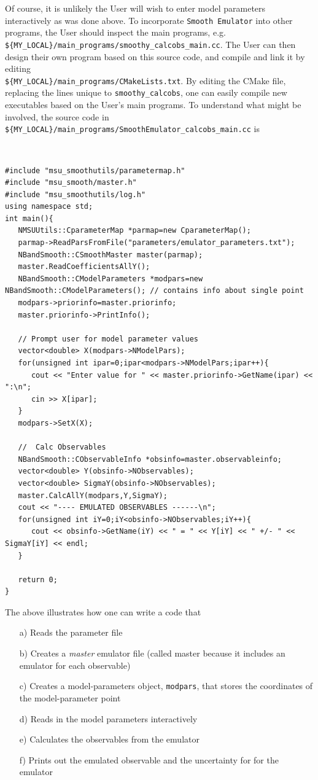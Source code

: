 \documentclass[UserManual.tex]{subfiles}
\begin{document}
Of course, it is unlikely the User will wish to enter model parameters interactively as was done above. To incorporate {\tt Smooth Emulator} into other programs, the User should inspect the main programs, e.g. {\tt \$\{MY\_LOCAL\}/main\_programs/smoothy\_calcobs\_main.cc}. The User can then design their own program based on this source code, and compile and link it by editing\\ {\tt \$\{MY\_LOCAL\}/main\_programs/CMakeLists.txt}. By editing the CMake file, replacing the lines unique to {\tt smoothy\_calcobs}, one can easily compile new executables based on the User's main programs. To understand what might be involved, the source code in {\tt \$\{MY\_LOCAL\}/main\_programs/SmoothEmulator\_calcobs\_main.cc} is
{\tt
\begin{verbatim}
#include "msu_smoothutils/parametermap.h"
#include "msu_smooth/master.h"
#include "msu_smoothutils/log.h"
using namespace std;
int main(){
   NMSUUtils::CparameterMap *parmap=new CparameterMap();
   parmap->ReadParsFromFile("parameters/emulator_parameters.txt");
   NBandSmooth::CSmoothMaster master(parmap);
   master.ReadCoefficientsAllY();
   NBandSmooth::CModelParameters *modpars=new NBandSmooth::CModelParameters(); // contains info about single point
   modpars->priorinfo=master.priorinfo;
   master.priorinfo->PrintInfo();

   // Prompt user for model parameter values
   vector<double> X(modpars->NModelPars);
   for(unsigned int ipar=0;ipar<modpars->NModelPars;ipar++){
      cout << "Enter value for " << master.priorinfo->GetName(ipar) << ":\n";
      cin >> X[ipar];
   }
   modpars->SetX(X);
   
   //  Calc Observables
   NBandSmooth::CObservableInfo *obsinfo=master.observableinfo;
   vector<double> Y(obsinfo->NObservables);
   vector<double> SigmaY(obsinfo->NObservables);
   master.CalcAllY(modpars,Y,SigmaY);
   cout << "---- EMULATED OBSERVABLES ------\n";
   for(unsigned int iY=0;iY<obsinfo->NObservables;iY++){
      cout << obsinfo->GetName(iY) << " = " << Y[iY] << " +/- " << SigmaY[iY] << endl;
   }

   return 0;
}
\end{verbatim}
}
The above illustrates how one can write a code that 
\begin{itemize}\itemsep=0pt
\item[a)] Reads the parameter file
\item[b)] Creates a {\it master} emulator file (called master because it includes an emulator for each observable)
\item[c)] Creates a model-parameters object, {\tt modpars}, that stores the coordinates of the model-parameter point
\item[d)] Reads in the model parameters interactively
\item[e)] Calculates the observables from the emulator
\item[f)] Prints out the emulated observable and the uncertainty for for the emulator
\end{itemize}
\end{document}
